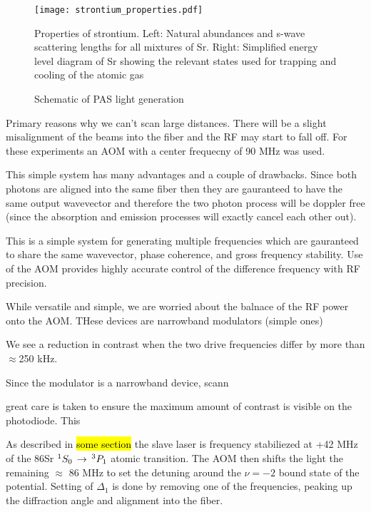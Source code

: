 \begin{figure} \label{fig:ch3_pas_light_gen}
	\centerline{
	\texttt{[image: strontium\_properties.pdf]}}
	\caption{Schematic of PAS light generation}{Properties of strontium. Left: Natural abundances and s-wave scattering lengths for all mixtures of Sr. Right: Simplified energy level diagram of Sr showing the relevant states used for trapping and cooling of the atomic gas}
\end{figure} 

Primary reasons why we can't scan large distances. There will be a slight misalignment of the beams into the fiber and the RF may start to fall off. For these experiments an AOM with a center frequecny of 90 MHz was used. 

This simple system has many advantages and a couple of drawbacks. Since both photons are aligned into the same fiber then they are gauranteed to have the same output wavevector and therefore the two photon process will be doppler free (since the absorption and emission processes will exactly cancel each other out).

This is a simple system for generating multiple frequencies which are gauranteed to share the same wavevector, phase coherence, and gross frequency stability. Use of the AOM provides highly accurate control of the difference frequency with RF precision. 

While versatile and simple, we are worried about the balnace of the RF power onto the AOM. THese devices are narrowband modulators (simple ones) 

We see a reduction in contrast when the two drive frequencies differ by more than $\approx$250 kHz. 

Since the modulator is a narrowband device, scann

great care is taken to ensure the maximum amount of contrast is visible on the photodiode. This 

As described in \hl{some section} the slave laser is frequency stabiliezed at +42 MHz of the 86Sr $^1S_0\,\rightarrow\,^3P_1$ atomic transition. The AOM then shifts the light the remaining $\approx$ 86 MHz to set the detuning around the $\nu=-2$ bound state of the \intPot{\gs}{\ex} potential. Setting of $\Delta_1$ is done by removing one of the frequencies, peaking up the diffraction angle and alignment into the fiber. 

